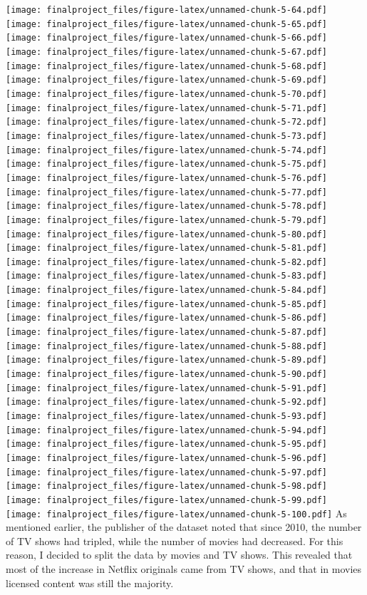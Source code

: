 \documentclass[
]{article}
\begin{document}
\texttt{[image: finalproject\_files/figure-latex/unnamed-chunk-5-64.pdf]}
\texttt{[image: finalproject\_files/figure-latex/unnamed-chunk-5-65.pdf]}
\texttt{[image: finalproject\_files/figure-latex/unnamed-chunk-5-66.pdf]}
\texttt{[image: finalproject\_files/figure-latex/unnamed-chunk-5-67.pdf]}
\texttt{[image: finalproject\_files/figure-latex/unnamed-chunk-5-68.pdf]}
\texttt{[image: finalproject\_files/figure-latex/unnamed-chunk-5-69.pdf]}
\texttt{[image: finalproject\_files/figure-latex/unnamed-chunk-5-70.pdf]}
\texttt{[image: finalproject\_files/figure-latex/unnamed-chunk-5-71.pdf]}
\texttt{[image: finalproject\_files/figure-latex/unnamed-chunk-5-72.pdf]}
\texttt{[image: finalproject\_files/figure-latex/unnamed-chunk-5-73.pdf]}
\texttt{[image: finalproject\_files/figure-latex/unnamed-chunk-5-74.pdf]}
\texttt{[image: finalproject\_files/figure-latex/unnamed-chunk-5-75.pdf]}
\texttt{[image: finalproject\_files/figure-latex/unnamed-chunk-5-76.pdf]}
\texttt{[image: finalproject\_files/figure-latex/unnamed-chunk-5-77.pdf]}
\texttt{[image: finalproject\_files/figure-latex/unnamed-chunk-5-78.pdf]}
\texttt{[image: finalproject\_files/figure-latex/unnamed-chunk-5-79.pdf]}
\texttt{[image: finalproject\_files/figure-latex/unnamed-chunk-5-80.pdf]}
\texttt{[image: finalproject\_files/figure-latex/unnamed-chunk-5-81.pdf]}
\texttt{[image: finalproject\_files/figure-latex/unnamed-chunk-5-82.pdf]}
\texttt{[image: finalproject\_files/figure-latex/unnamed-chunk-5-83.pdf]}
\texttt{[image: finalproject\_files/figure-latex/unnamed-chunk-5-84.pdf]}
\texttt{[image: finalproject\_files/figure-latex/unnamed-chunk-5-85.pdf]}
\texttt{[image: finalproject\_files/figure-latex/unnamed-chunk-5-86.pdf]}
\texttt{[image: finalproject\_files/figure-latex/unnamed-chunk-5-87.pdf]}
\texttt{[image: finalproject\_files/figure-latex/unnamed-chunk-5-88.pdf]}
\texttt{[image: finalproject\_files/figure-latex/unnamed-chunk-5-89.pdf]}
\texttt{[image: finalproject\_files/figure-latex/unnamed-chunk-5-90.pdf]}
\texttt{[image: finalproject\_files/figure-latex/unnamed-chunk-5-91.pdf]}
\texttt{[image: finalproject\_files/figure-latex/unnamed-chunk-5-92.pdf]}
\texttt{[image: finalproject\_files/figure-latex/unnamed-chunk-5-93.pdf]}
\texttt{[image: finalproject\_files/figure-latex/unnamed-chunk-5-94.pdf]}
\texttt{[image: finalproject\_files/figure-latex/unnamed-chunk-5-95.pdf]}
\texttt{[image: finalproject\_files/figure-latex/unnamed-chunk-5-96.pdf]}
\texttt{[image: finalproject\_files/figure-latex/unnamed-chunk-5-97.pdf]}
\texttt{[image: finalproject\_files/figure-latex/unnamed-chunk-5-98.pdf]}
\texttt{[image: finalproject\_files/figure-latex/unnamed-chunk-5-99.pdf]}
\texttt{[image: finalproject\_files/figure-latex/unnamed-chunk-5-100.pdf]}
As mentioned earlier, the publisher of the dataset noted that since
2010, the number of TV shows had tripled, while the number of movies had
decreased. For this reason, I decided to split the data by movies and TV
shows. This revealed that most of the increase in Netflix originals came
from TV shows, and that in movies licensed content was still the
majority.
\end{document}
